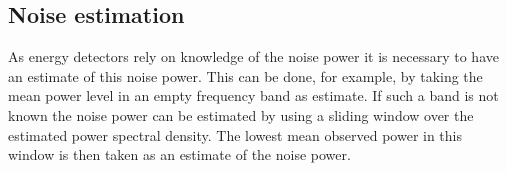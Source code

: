 \documentclass[a4paper, openany, oneside]{memoir}
\begin{document}
\subsection{Noise estimation}
As energy detectors rely on knowledge of the noise power it is necessary to have an estimate of this noise power. This can be done,
for example, by taking the mean power level in an empty frequency band as estimate. If such a band is not known the noise power can be estimated by using a sliding window over the estimated power spectral density. The lowest mean observed power in this window is then taken
as an estimate of the noise power.

\end{document}
